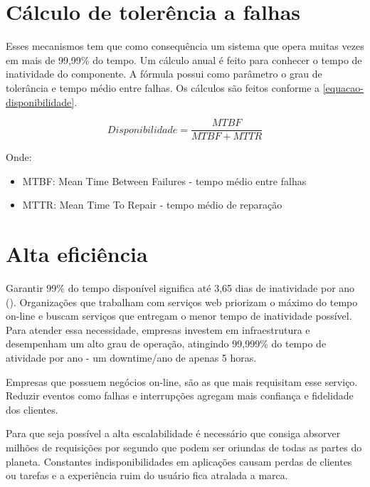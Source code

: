 \section{Cálculo de tolerência a falhas}

Esses mecanismos tem que como consequência um sistema que opera
muitas vezes em mais de 99,99\% do tempo.
Um cálculo anual é feito para conhecer o tempo de inatividade do componente.
A fórmula possui como parâmetro o grau de tolerância e tempo médio entre falhas.
Os cálculos são feitos conforme a \autoref{equacao-disponibilidade}.

\begin{equation}\label{equacao-disponibilidade}
Disponibilidade = \frac{MTBF}{MTBF + MTTR}
\end{equation}

Onde:

\begin{itemize}

	\item MTBF: Mean Time Between Failures - tempo médio entre falhas

	\item MTTR: Mean Time To Repair - tempo médio de reparação

\end{itemize}

\section{Alta eficiência}

Garantir 99\% do tempo disponível significa até 3,65 dias de inatividade por ano (\cite{alta-eficiencia}).
Organizações que trabalham com serviços web priorizam o máximo do tempo on-line e buscam
serviços que entregam o menor tempo de inatividade possível.
Para atender essa necessidade, empresas investem em infraestrutura e desempenham um alto
grau de operação, atingindo 99,999\% do tempo de atividade por ano - um downtime/ano de
apenas 5 horas.

Empresas que possuem negócios on-line, são as que mais requisitam esse serviço.
Reduzir eventos como falhas e interrupções agregam mais confiança e fidelidade dos clientes.

Para que seja possível a alta escalabilidade é necessário que consiga absorver milhões de
requisições por segundo que podem ser oriundas de todas as partes do planeta.
Constantes indisponibilidades em aplicações causam perdas de clientes ou tarefas e a experiência
ruim do usuário fica atralada a marca.

